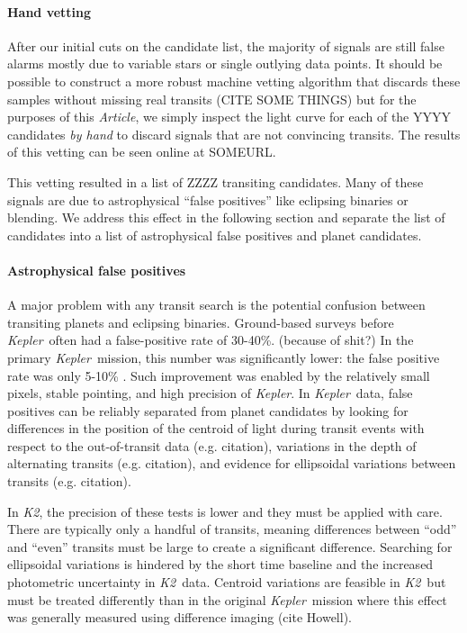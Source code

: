 \documentclass[12pt,preprint]{aastex}
\newcommand{\project}[1]{\textsl{#1}} %
\newcommand{\kepler}{\project{Kepler}}
\newcommand{\KT}{\project{K2}}
\newcommand{\paper}{\textsl{Article}}
\begin{document}
\paragraph{Hand vetting}

After our initial cuts on the candidate list, the majority of signals are
still false alarms mostly due to variable stars or single outlying data
points.
It should be possible to construct a more robust machine vetting algorithm
that discards these samples without missing real transits (CITE SOME THINGS)
but for the purposes of this \paper, we simply inspect the light curve for
each of the YYYY candidates \emph{by hand} to discard signals that are not
convincing transits.
The results of this vetting can be seen online at SOMEURL.

This vetting resulted in a list of ZZZZ transiting candidates.
Many of these signals are due to astrophysical ``false positives'' like
eclipsing binaries or blending.
We address this effect in the following section and separate the list of
candidates into a list of astrophysical false positives and planet candidates.


\paragraph{Astrophysical false positives}

A major problem with any transit search is the potential confusion between
transiting planets and eclipsing binaries.
Ground-based surveys before \kepler\ often had a false-positive rate
of 30-40\%. (because of shit?)
In the primary \kepler\ mission, this number was significantly lower:
the false positive rate was only 5-10\% \citep{Morton:2011}.
Such improvement was enabled by the relatively small pixels, stable
pointing, and high precision of \kepler.
In \kepler\ data, false positives can be reliably separated from
planet candidates by looking for differences in the position of the
centroid of light during transit events with respect to the
out-of-transit data (e.g. citation), variations in the depth of
alternating transits (e.g. citation), and evidence for ellipsoidal
variations between transits (e.g. citation).

In \KT, the precision of these tests is lower and they must be applied with
care.
There are typically only a handful of transits, meaning differences between
``odd'' and ``even'' transits must be large to create a significant
difference.
Searching for ellipsoidal variations is hindered by the short time baseline
and the increased photometric uncertainty in \KT\ data.
Centroid variations are feasible in \KT\ but must be treated differently than
in the original \kepler\ mission where this effect was generally measured
using difference imaging (cite Howell).
\end{document}
